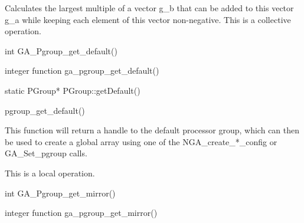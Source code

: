 \documentclass[12pt]{article}
\begin{document}
\begin{desc}

Calculates the largest multiple of a vector g_b that can be added to this vector g_a while keeping each element of this vector non-negative.
This is a collective operation.
\end{desc}


\begin{capi}
\begin{ccode}
int GA_Pgroup_get_default()
\end{ccode}
\end{capi}

\begin{fapi}
\begin{fcode}
integer function ga_pgroup_get_default()
\end{fcode}
\end{fapi}

\begin{cxxapi}
\begin{cxxcode}
static PGroup* PGroup::getDefault()
\end{cxxcode}
\end{cxxapi}

\begin{pyapi}
\begin{pycode}
pgroup_get_default() 
\end{pycode}
\end{pyapi} 

\local
\begin{desc}

This function will return a handle to the default processor group, which can then be used to create a global array using one of the NGA_create_*_config or GA_Set_pgroup calls.

This is a local operation. 
\end{desc}


\begin{capi}
\begin{ccode}
int GA_Pgroup_get_mirror()
\end{ccode}
\end{capi}

\begin{fapi}
\begin{fcode}
integer function ga_pgroup_get_mirror()
\end{fcode}
\end{fapi}
\end{document}
